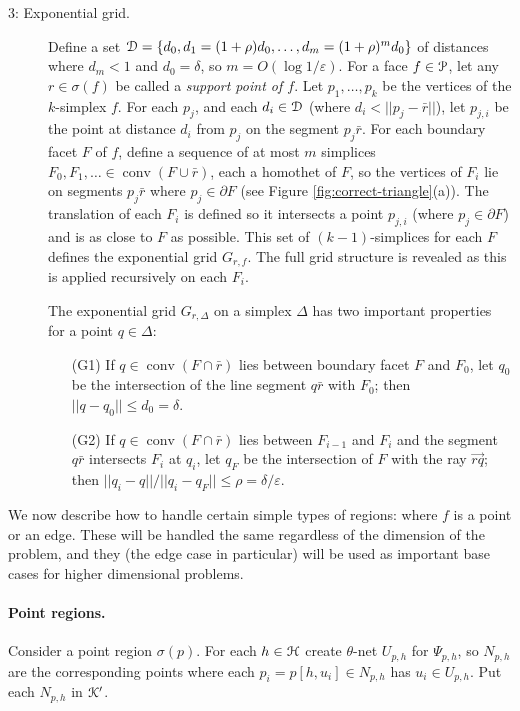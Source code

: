 \documentclass[11pt]{myclass}
\newcommand{\eps}{\varepsilon}
\renewcommand{\c}[1]{\ensuremath{\EuScript{#1}}}
\def\kernel{\EuScript{K}}
\newcommand{\conv}[1]{\mathop{\mathrm{conv}}(#1)}
\newcommand{\polyt}{\EuScript{P}}
\newcommand{\fr}{\bar{r}}
\newcommand{\point}[3]{{#1}[#3,#2]}
\begin{document}
\begin{description}
\item[3: Exponential grid.]
Define a set $\c{D} = \{d_0, d_1 = (1+\rho) d_0, \ldots, d_m = (1+\rho)^m d_0\}$ of distances where $d_m < 1$ and $d_0 = \delta$, so $m = O(\log 1/\eps)$.  
For a face $f \in \polyt$, let any $r \in \sigma(f)$ be called a \emph{support point of $f$}.  
Let $p_1, \ldots, p_k$ be the vertices of the $k$-simplex $f$.  For each $p_j$, and each $d_i \in \c{D}$ (where $d_i < ||p_j - \fr||$), let $p_{j,i}$ be the point at distance $d_i$ from $p_j$ on the segment $p_j \fr$.  
For each boundary facet $F$ of $f$, define a sequence of at most $m$ simplices $F_0, F_1, \ldots \in \conv{F \cup \fr}$, each a homothet of $F$, so the vertices of $F_i$ lie on segments $p_j \fr$ where $p_j \in \partial F$ (see Figure \ref{fig:correct-triangle}(a)).  
The translation of each $F_i$ is defined so it intersects a point $p_{j,i}$ (where $p_j \in \partial F$) and is as close to $F$ as possible.  This set of $(k-1)$-simplices for each $F$ defines the exponential grid $G_{r,f}$.
The full grid structure is revealed as this is applied recursively on each $F_i$.  



The exponential grid $G_{r,\Delta}$ on a simplex $\Delta$ has two important properties for a point $q \in \Delta$:  
\begin{itemize} \denselist
\item[(G1)] If $q \in \conv{F \cap \fr}$ lies between boundary facet $F$ and $F_0$, let $q_0$ be the intersection of the line segment $q \fr$ with $F_0$; then $||q - q_0|| \leq d_0 = \delta$.
\item[(G2)] If $q \in \conv{F \cap \fr}$ lies between $F_{i-1}$ and $F_i$ and the segment $q \fr$ intersects $F_i$ at $q_i$, let $q_F$ be the intersection of $F$ with the ray $\overrightarrow{r q}$; then $||q_i - q|| / ||q_i - q_F|| \leq \rho = \delta/\eps$.  
\end{itemize}
\end{description}


We now describe how to handle certain simple types of regions: where $f$ is a point or an edge.  These will be handled the same regardless of the dimension of the problem, and they (the edge case in particular) will be used as important base cases for higher dimensional problems.  

\paragraph{Point regions.}
Consider a point region $\sigma(p)$.  
For each $h \in \c{H}$ create $\theta$-net $U_{p,h}$ for $\Psi_{p,h}$, so $N_{p,h}$ are the corresponding points where each $p_i = \point{p}{u_i}{h} \in N_{p,h}$ has $u_i \in U_{p,h}$.   Put each $N_{p,h}$ in $\kernel'$.  
\end{document}
